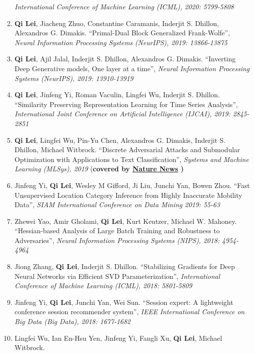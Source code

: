 \documentclass[margin, 10pt]{res} %
\begin{document}
\begin{resume}
\begin{enumerate}
{    \textit{International Conference of Machine Learning (ICML), 2020: 5799-5808}}
  \item{ \textbf{Qi Lei}, Jiacheng Zhuo, Constantine Caramanis, Inderjit S. 
    Dhillon, Alexandros G. Dimakis. ``Primal-Dual Block Generalized Frank-Wolfe'', 
  \textit{Neural Information Processing Systems (NeurIPS), 2019: 13866-13875} }
  \item{ \textbf{Qi Lei}, Ajil Jalal, Inderjit S. Dhillon, Alexandros G. 
      Dimakis. ``Inverting Deep Generative models, One layer at a time'', 
    \textit{Neural Information Processing Systems (NeurIPS), 2019: 13910-13919} }

  \item{ \textbf{Qi Lei}, Jinfeng Yi, Roman Vaculin, Lingfei Wu, Inderjit S. 
      Dhillon. ``Similarity Preserving Representation Learning for Time Series 
      Analysis'', \textit{International Joint Conference on Artificial 
    Intelligence (IJCAI), 2019: 2845-2851}}
  \item{\textbf{Qi Lei}, Lingfei Wu, Pin-Yu Chen, Alexandros G. Dimakis, Inderjit S. 
    Dhillon, Michael Witbrock. ``Discrete Adversarial Attacks and Submodular 
    Optimization with Applications to Text Classification'', \textit{Systems and Machine 
  Learning (MLSys), 2019} (\textbf{covered by \href{https://www.nature.com/articles/d41586-019-01510-1}{Nature News} )  } }
\item{Jinfeng Yi, \textbf{Qi Lei}, Wesley M Gifford, Ji Liu, Junchi Yan, Bowen Zhou. ``Fast Unsupervised Location Category Inference from Highly Inaccurate Mobility Data'', \textit{SIAM International Conference on Data Mining 2019: 55-63}}
\item{Zhewei Yao, Amir Gholami, \textbf{Qi Lei}, Kurt Keutzer, Michael W. 
  Mahoney. ``Hessian-based Analysis of Large Batch Training and Robustness to 
Adversaries'', \textit{Neural Information Processing Systems (NIPS), 2018: 4954-4964}}
  \item{Jiong Zhang, \textbf{Qi Lei}, Inderjit S. Dhillon. 
        ``Stabilizing Gradients for Deep 
       Neural Networks via Efficient SVD Parameterization'', \textit{
    International Conference of Machine Learning (ICML), 2018: 5801-5809}}
\item{Jinfeng Yi, \textbf{Qi Lei}, Junchi Yan, Wei Sun. ``Session expert: A lightweight conference session recommender system'', \textit{IEEE International Conference on Big Data (Big Data), 2018: 1677-1682}}
  \item{Lingfei Wu, Ian En-Hsu Yen, Jinfeng Yi, Fangli Xu, \textbf{Qi Lei}, Michael Witbrock.
}
\end{enumerate}
\end{resume}
\end{document}
